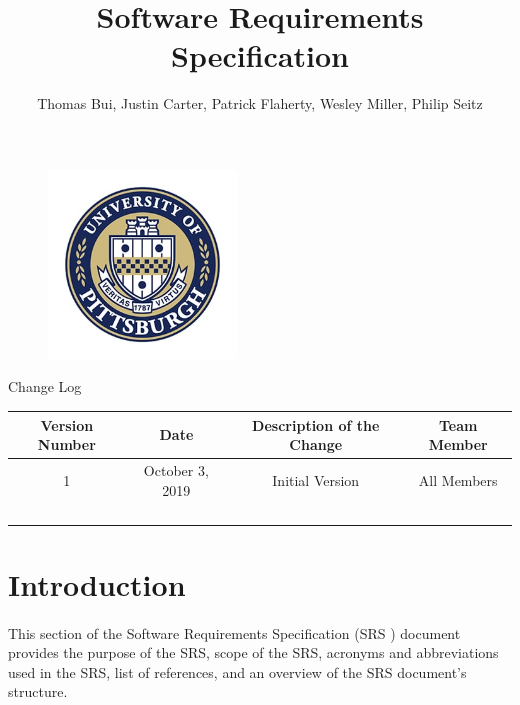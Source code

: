 \documentclass{article}
\title{\textbf{Software Requirements Specification}}
\begin{document}
\begin{figure}
    \centering
    \includegraphics[height=5cm,width=5cm]{pitt-min.jpg}
\end{figure}

\author{Thomas Bui, Justin Carter, Patrick Flaherty, Wesley Miller, Philip Seitz}

\date{}



\maketitle

\newenvironment{subs}
  {\adjustwidth{3em}{0pt}}
  {\endadjustwidth}

\pagebreak 


\begin{center}
\Title{}
Change Log
\newline
 \begin{tabular}{||c c c c||} 
 \hline
 Version Number & Date & Description of the Change & Team Member \\ [0.5ex] 
 \hline\hline
 1 & October 3, 2019 & Initial Version & All Members \\ 
 \hline
  &  &  &  \\
 \hline
  &  &  &  \\
 \hline
  & &  &  \\
 \hline
  &  &  &  \\ [1ex] 
 \hline
\end{tabular}
\end{center}


\pagebreak
\newpage
\tableofcontents
\newpage

\section{Introduction}
\paragraph{}
This section of the Software Requirements Specification (SRS ) document provides the purpose of the SRS, scope of the SRS, acronyms and abbreviations used in the SRS, list of references, and an overview of the SRS document’s structure.
\end{document}
